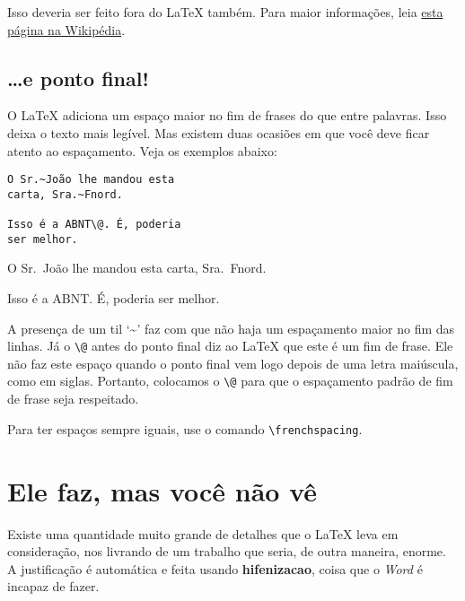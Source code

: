 Isso deveria ser feito fora do \LaTeX{} também. Para maior informações, leia \href{http://pt.wikipedia.org/wiki/Travess\%C3\%A3o#Como_fazer}{esta página na Wikipédia}.

\subsection{\ldots e ponto final!}

O \LaTeX{} adiciona um espaço maior no fim de frases do que entre palavras. Isso deixa o texto mais legível. Mas existem duas ocasiões em que você deve ficar atento ao espaçamento. Veja os exemplos abaixo:

\vspace{1em}

\begin{center}
\begin{minipage}[t]{6cm}
\begin{verbatim}
O Sr.~João lhe mandou esta 
carta, Sra.~Fnord.

Isso é a ABNT\@. É, poderia 
ser melhor.
\end{verbatim}
\end{minipage}
\begin{minipage}[t]{6cm}
O Sr.~João lhe mandou esta carta, Sra.~Fnord.

Isso é a ABNT\@. É, poderia ser melhor.
\end{minipage}
\end{center}

\vspace{1em}

A presença de um til `\~{}' faz com que não haja um espaçamento maior no fim das linhas. Já o \verb+\@+ antes do ponto final diz ao \LaTeX{} que este é um fim de frase. Ele não faz este espaço quando o ponto final vem logo depois de uma letra maiúscula, como em siglas. Portanto, colocamos o \verb+\@+ para que o espaçamento padrão de fim de frase seja respeitado.

Para ter espaços sempre iguais, use o comando \verb+\frenchspacing+. 

\section{Ele faz, mas você não vê}

Existe uma quantidade muito grande de detalhes que o \LaTeX{} leva em consideração, nos livrando de um trabalho que seria, de outra maneira, enorme. A justificação é automática e feita usando \textbf{\gls{hifenizacao}}, coisa que o \emph{Word} é incapaz de fazer.

